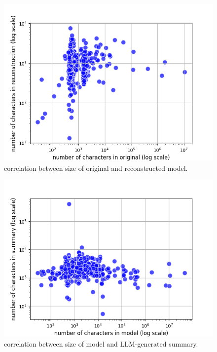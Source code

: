 \begin{figure}[htbp]
\centerline{\includegraphics[width=\linewidth]{"./correlation between size of original and reconstructed model.png"}}
\caption{correlation between size of original and reconstructed model.}
\label{fig}
\end{figure}


\begin{figure}[htbp]
\centerline{\includegraphics[width=\linewidth]{"./correlation between size of model and LLM-generated summary.png"}}
\caption{correlation between size of model and LLM-generated summary.}
\label{fig}
\end{figure}



